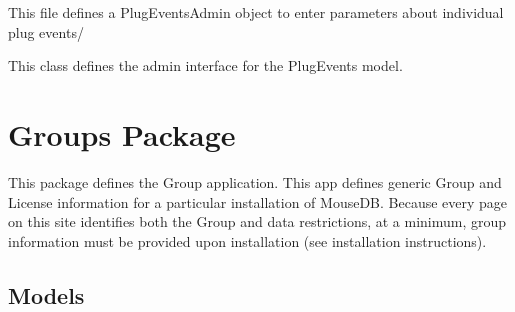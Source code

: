 \documentclass[letterpaper,10pt,english]{sphinxmanual}
\begin{document}
This file defines a PlugEventsAdmin object to enter parameters about individual plug events/

\begin{fulllineitems}
\label{api:timed_mating.admin.PlugEventsAdmin}
This class defines the admin interface for the PlugEvents model.

\begin{fulllineitems}
\label{api:timed_mating.admin.PlugEventsAdmin.media}
\end{fulllineitems}


\end{fulllineitems}



\section{Groups Package}
\label{api:module-groups}\label{api:groups-package}
This package defines the Group application.
This app defines generic Group and License information for a particular installation of MouseDB.  
Because every page on this site identifies both the Group and data restrictions, at a minimum, group information must be provided upon installation (see installation instructions).


\subsection{Models}
\label{api:id9}\label{api:module-groups.models}
\end{document}
